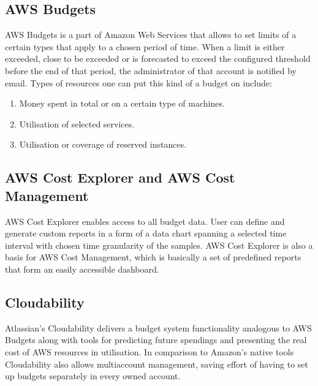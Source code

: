 \documentclass[licencjacka,en]{thesisclass}
\begin{document}
    \subsection{AWS Budgets}

    AWS Budgets is a part of Amazon Web Services that allows to set limits of a certain types
    that apply to a chosen period of time.
    When a limit is either exceeded, close to be exceeded or is forecasted to exceed the configured threshold
    before the end of that period, the administrator of that account is notified by email.
    Types of resources one can put this kind of a budget on include:

    \begin{enumerate}
        \item Money spent in total or on a certain type of machines.
        \item Utilisation of selected services.
        \item Utilisation or coverage of reserved instances.
    \end{enumerate}
    \begin{flushright}
        \cite{AWSDocs}
    \end{flushright}

    \subsection{AWS Cost Explorer and AWS Cost Management}

    AWS Cost Explorer enables access to all budget data.
    User can define and generate custom reports in a form of a data chart spanning a selected time interval with chosen time granularity of the samples.
    AWS Cost Explorer is also a basis for AWS Cost Management, which is basically a set of predefined reports that form an easily accessible dashboard.

    \subsection{Cloudability}

    Atlassian's Cloudability delivers a budget system functionality analogous to AWS Budgets
    along with tools for predicting future spendings and presenting the real cost of AWS resources in utilisation.
    In comparison to Amazon's native tools Cloudability also allows multiaccount management,
    saving effort of having to set up budgets separately in every owned account.
\end{document}

